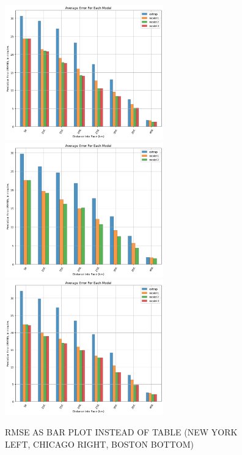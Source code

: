 \documentclass[USenglish,twocolumn]{article}
\theoremstyle{dgthm}
\theoremstyle{dgdef}
\begin{document}
\begin{figure}[ht]
    \centering
    \includegraphics[width=2.7in]{../analysis/nyc_rmse_bar.png}
    \includegraphics[width=2.7in]{../analysis/chi_rmse_bar.png}
    \includegraphics[width=2.7in]{../analysis/bos_rmse_bar.png}
    \caption{RMSE AS BAR PLOT INSTEAD OF TABLE (NEW YORK LEFT, CHICAGO RIGHT, BOSTON BOTTOM)}
\end{figure}
\end{document}
